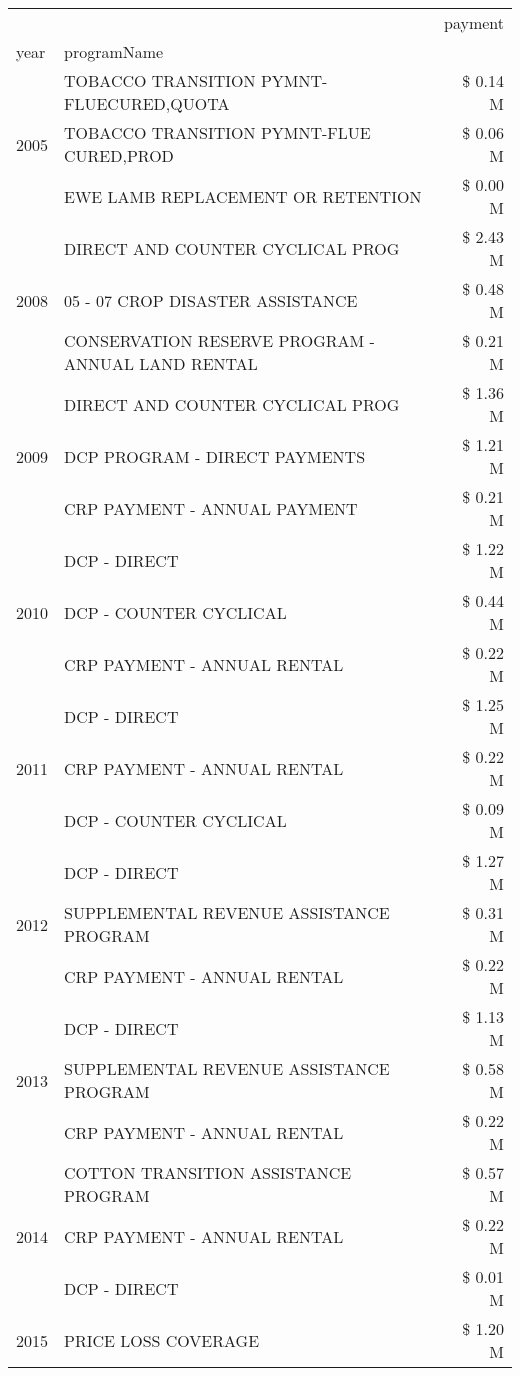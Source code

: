 \begin{tabular}{llr}
\toprule
 &  & payment \\
year & programName &  \\
\midrule
\multirow[t]{3}{*}{2005} & TOBACCO TRANSITION PYMNT-FLUECURED,QUOTA & \$ 0.14 M \\
 & TOBACCO TRANSITION PYMNT-FLUE CURED,PROD & \$ 0.06 M \\
 & EWE LAMB REPLACEMENT OR RETENTION & \$ 0.00 M \\
\cline{1-3}
\multirow[t]{3}{*}{2008} & DIRECT AND COUNTER CYCLICAL PROG & \$ 2.43 M \\
 & 05 - 07 CROP DISASTER ASSISTANCE & \$ 0.48 M \\
 & CONSERVATION RESERVE PROGRAM - ANNUAL LAND RENTAL & \$ 0.21 M \\
\cline{1-3}
\multirow[t]{3}{*}{2009} & DIRECT AND COUNTER CYCLICAL PROG & \$ 1.36 M \\
 & DCP PROGRAM - DIRECT PAYMENTS & \$ 1.21 M \\
 & CRP PAYMENT - ANNUAL PAYMENT & \$ 0.21 M \\
\cline{1-3}
\multirow[t]{3}{*}{2010} & DCP - DIRECT & \$ 1.22 M \\
 & DCP - COUNTER CYCLICAL & \$ 0.44 M \\
 & CRP PAYMENT - ANNUAL RENTAL & \$ 0.22 M \\
\cline{1-3}
\multirow[t]{3}{*}{2011} & DCP - DIRECT & \$ 1.25 M \\
 & CRP PAYMENT - ANNUAL RENTAL & \$ 0.22 M \\
 & DCP - COUNTER CYCLICAL & \$ 0.09 M \\
\cline{1-3}
\multirow[t]{3}{*}{2012} & DCP - DIRECT & \$ 1.27 M \\
 & SUPPLEMENTAL REVENUE ASSISTANCE PROGRAM & \$ 0.31 M \\
 & CRP PAYMENT - ANNUAL RENTAL & \$ 0.22 M \\
\cline{1-3}
\multirow[t]{3}{*}{2013} & DCP - DIRECT & \$ 1.13 M \\
 & SUPPLEMENTAL REVENUE ASSISTANCE PROGRAM & \$ 0.58 M \\
 & CRP PAYMENT - ANNUAL RENTAL & \$ 0.22 M \\
\cline{1-3}
\multirow[t]{3}{*}{2014} & COTTON TRANSITION ASSISTANCE PROGRAM & \$ 0.57 M \\
 & CRP PAYMENT - ANNUAL RENTAL & \$ 0.22 M \\
 & DCP - DIRECT & \$ 0.01 M \\
\cline{1-3}
\multirow[t]{3}{*}{2015} & PRICE LOSS COVERAGE & \$ 1.20 M \\

\end{tabular}
